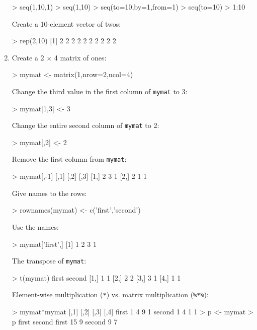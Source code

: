 \begin{enumerate}
\begin{console}
> seq(1,10,1)
> seq(1,10)
> seq(to=10,by=1,from=1)
> seq(to=10)
> 1:10
\end{console}

Create a 10-element vector of twos:

\begin{console}
> rep(2,10)
 [1] 2 2 2 2 2 2 2 2 2 2
\end{console}

\item Create a 2 $\times$ 4 matrix of ones:

\begin{console}
> mymat <- matrix(1,nrow=2,ncol=4)
\end{console}

Change the third value in the first column of \texttt{mymat} to 3:

\begin{console}
> mymat[1,3] <- 3
\end{console}

Change the entire second column of \texttt{mymat} to 2:

\begin{console}
> mymat[,2] <- 2
\end{console}

Remove the first column from \texttt{mymat}:

\begin{console}
> mymat[,-1]
     [,1] [,2] [,3]
[1,]    2    3    1
[2,]    2    1    1
\end{console}

Give names to the rows:

\begin{console}
> rownames(mymat) <- c('first','second')
\end{console}

Use the names:

\begin{console}
> mymat['first',]
[1] 1 2 3 1
\end{console}

The transpose of \texttt{mymat}:

\begin{console}
> t(mymat)
     first second
[1,]    1    1
[2,]    2    2
[3,]    3    1
[4,]    1    1
\end{console}

Element-wise multiplication (\verb|*|) vs. matrix multiplication
(\verb|%*%|):

\begin{console}
> mymat*mymat
       [,1] [,2] [,3] [,4]
first     1    4    9    1
second    1    4    1    1
> p <- mymat %
> p
       first second
first     15      9
second     9      7
\end{console}  


\end{enumerate}
